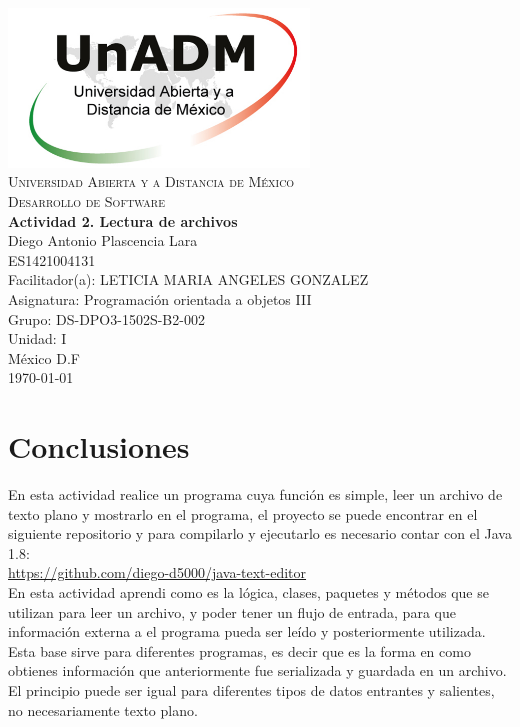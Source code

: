 \documentclass[spanish,12pt,letterpapper]{article}
\begin{document}
	\begin{titlepage}
		\begin{center}
			\includegraphics[width=0.6\textwidth]{../logoUnADM}~\\[1cm] 
			\textsc{Universidad Abierta y a Distancia de México}\\[0.8cm]
			\textsc{Desarrollo de Software}\\[1.8cm]
			
			\textbf{ \Large Actividad 2. Lectura de archivos}\\[3cm]
			
			Diego Antonio Plascencia Lara\\ ES1421004131 \\[0.4cm]
			Facilitador(a): LETICIA MARIA ANGELES GONZALEZ\\
			Asignatura: Programación orientada a objetos III\\
			Grupo: DS-DPO3-1502S-B2-002 \\
			Unidad: I \\
			
			\vfill México D.F\\{\today}
			
		\end{center}
	\end{titlepage}
	
	\section{Conclusiones}
	En esta actividad realice un programa cuya función es simple, leer un archivo de texto plano y mostrarlo en el programa, el proyecto se puede encontrar en el siguiente repositorio y para compilarlo y ejecutarlo es necesario contar con el Java 1.8:\\
	
	\url{https://github.com/diego-d5000/java-text-editor} \\
	
	En esta actividad aprendi como es la lógica, clases, paquetes y métodos que se utilizan para leer un archivo, y poder tener un flujo de entrada, para que información externa a el programa pueda ser leído y posteriormente utilizada.\\
	
	Esta base sirve para diferentes programas, es decir que es la forma en como obtienes información que anteriormente fue serializada y guardada en un archivo. El principio puede ser igual para diferentes tipos de datos entrantes y salientes, no necesariamente texto plano.
	
	
\end{document}
